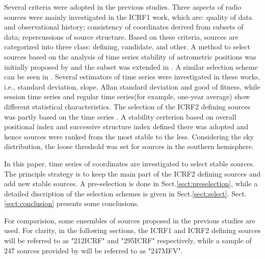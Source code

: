 \documentclass{aa}
\begin{document}
Several criteria were adopted in the previous studies. Three aspects of radio sources were mainly investigated in the ICRF1 work\citep{arias2004,ma1998}, which are: quality of data and observational history; consistency of coordinates derived from subsets of data; repercussions of source structure. Based on these criteria, sources are categorized into three class: defining, candidate, and other. A method to select sources based on the analysis of time series stability of astrometric positions was initially proposed by \cite{FV2003} and the subset was extended in \cite{Feissel-Vernier2006}. A similar selection scheme can be seen in \cite{gontier2008,Lambert2009}. Several estimators of time series were investigated in these works, i.e., standard deviation, slope, Allan standard deviation and good of fitness, while session time series and regular time series(for example, one-year average) show different statistical characteristics. The selection of the ICRF2 defining sources was partly based on the time series \citep{2009ITN....35....1M,IERS2}. A stability certerion based on overall positional index and successive structure index defined there was adopted and hence sources were ranked from the most stable to the less. Considering the sky distribution, the loose threshold was set for sources in the southern hemisphere. 

In this paper, time series of coordinates are investigated to select stable sources. The principle strategy is to keep the main part of the ICRF2 defining sources and add new stable sources. A pre-selection is done in Sect.\ref{sect:preselection}, while a detailed discription of the selection schemes is given in Sect.\ref{sect:select}. Sect.\ref{sect:conclusion} presents some conclusions.


For comparision, some ensembles of sources proposed in the previous studies are used. For clarity, in the following sections, the ICRF1 and ICRF2 defining sources will be referred to as "212ICRF" and "295ICRF" respectively, while a sample of 247 sources provided by \cite{Feissel-Vernier2006} will be referred to as "247MFV".
\end{document}
